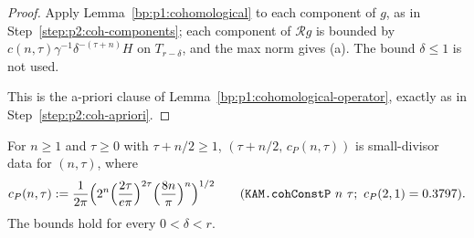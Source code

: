 \begin{proof}
\label{step:p2s:cc-sol}
Apply Lemma~\ref{bp:p1:cohomological} to each component of $g$, as in Step~\ref{step:p2:coh-components}; each
component of $\mathcal Rg$ is bounded by $c(n,\tau)\gamma^{-1}\delta^{-(\tau+n)}H$ on $T_{r-\delta}$, and the max
norm gives (a). The bound $\delta\le1$ is not used.

\label{step:p2s:cc-apriori}
This is the a-priori clause of Lemma~\ref{bp:p1:cohomological-operator}, exactly as in
Step~\ref{step:p2:coh-apriori}.
\end{proof}

\begin{lemma}\label{bp:p2s:cohdata-parseval}
For $n\ge1$ and $\tau\ge0$ with $\tau+n/2\ge1$, $(\tau+n/2,\,c_P(n,\tau))$ is small-divisor data for $(n,\tau)$, where
\[
c_P(n,\tau):=\frac1{2\pi}\Bigl(2^n\Bigl(\frac{2\tau}{e\pi}\Bigr)^{2\tau}\Bigl(\frac{8n}\pi\Bigr)^n\Bigr)^{1/2}
\qquad(\texttt{KAM.cohConstP}\ n\ \tau;\ c_P(2,1)=0.3797).
\]
The bounds hold for every $0<\delta<r$.
\par{}\par
{}
\end{lemma}

